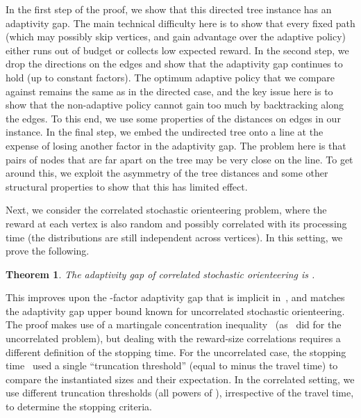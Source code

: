 \documentclass[11pt,letterpaper]{article}
\newtheorem{theorem}{Theorem}[section]
\numberwithin{algorithm}{section}
\begin{document}
In the first step of the proof, we show that this directed tree instance has an  adaptivity gap.
The main technical difficulty here is to show that every fixed path (which may possibly skip vertices, and gain advantage over the adaptive policy) either runs out of budget  or collects low expected reward.
In the second step, we drop the directions on the edges and show that the adaptivity gap continues to hold (up to constant factors). The optimum adaptive policy that we compare against remains the same as in the directed case, and the key issue here is to show that
the non-adaptive policy cannot gain too much by backtracking along the edges.
To this end, we use some properties of the distances on edges in our instance.
In the final step, we embed the undirected tree onto a line at the expense of losing another  factor in  the adaptivity gap.
The problem here is that pairs of nodes that are far apart on the tree may be very close on the line.
To get around this, we exploit the asymmetry of the tree distances and some other structural properties to show that this has limited effect.


\medskip

Next, we consider the correlated stochastic orienteering problem, where the reward at each vertex is also random and possibly correlated with its processing time (the distributions are still independent across vertices). In this setting, we prove the following.\begin{theorem}\label{thm:corr-loglog-UB}
The adaptivity gap of correlated stochastic orienteering is .
\end{theorem}
 This improves upon the -factor adaptivity gap that is implicit in~\cite{GKNR12}, and matches the adaptivity gap upper bound known for uncorrelated stochastic orienteering. The  proof makes use of a martingale concentration inequality~\cite{Zhang05} (as~\cite{GKNR12} did for the uncorrelated problem), but dealing with the reward-size correlations requires a different definition of the stopping time. For the uncorrelated case, the stopping time~\cite{GKNR12} used a single ``truncation threshold'' (equal to  minus the travel time)  to compare the instantiated sizes and their expectation.
In the correlated setting, we use  different
truncation thresholds (all powers of ), irrespective of the travel time, to determine the stopping criteria.




\medskip
\end{document}
